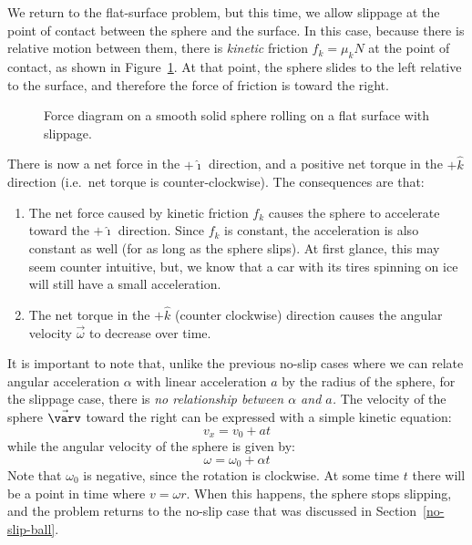 \documentclass{../../oss-handout}
\newcommand{\iii}{\hat\imath}
\newcommand{\kkk}{\hat k}
\begin{document}
We return to the flat-surface problem, but this time, we allow slippage at the
point of contact between the sphere and the surface. In this case, because there
is relative motion between them, there is \emph{kinetic} friction $f_k=\mu_kN$
at the point of contact, as shown in Figure~\ref{slip1}. At that point, the
sphere slides to the left relative to the surface, and therefore the force of
friction is toward the right.
\begin{figure}[!ht]
  \centering
  \caption{Force diagram on a smooth solid sphere rolling on a flat surface with
    slippage.}
  \label{slip1}
\end{figure}

There is now a net force in the $+\iii$ direction, and a positive net torque in
the $+\kkk$ direction (i.e.\ net torque is counter-clockwise). The consequences
are that:
\begin{enumerate}[topsep=0pt]
\item The net force caused by kinetic friction $f_k$ causes the sphere to
  accelerate toward the $+\iii$ direction. Since $f_k$ is constant, the
  acceleration is also constant as well (for as long as the sphere slips). At
  first glance, this may seem counter intuitive, but, we know that a car with
  its tires spinning on ice will still have a small acceleration.
\item The net torque in the $+\kkk$ (counter clockwise) direction
  causes the angular velocity $\vec\omega$ to decrease over time.
\end{enumerate}
It is important to note that, unlike the previous no-slip cases where we can 
relate angular acceleration $\alpha$ with linear acceleration $a$ by the radius
of the sphere, for the slippage case, there is \emph{no relationship between
  $\alpha$ and $a$.} The velocity of the sphere $\vec\varv$ toward the right can
be expressed with a simple kinetic equation:
\begin{equation}
  v_x=v_0+at
\end{equation}
while the angular velocity of the sphere is given by:
\begin{equation}
  \omega=\omega_0+\alpha t
\end{equation}
Note that $\omega_0$ is negative, since the rotation is clockwise. At some time
$t$ there will be a point in time where $v=\omega r$. When this happens, the
sphere stops slipping, and the problem returns to the no-slip case that was
discussed in Section~\ref{no-slip-ball}.
\end{document}
